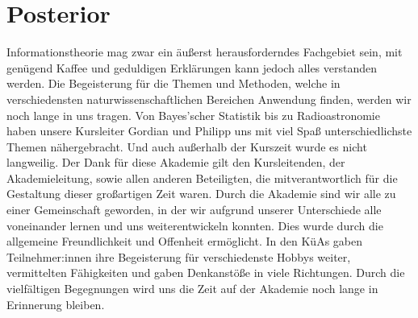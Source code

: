 \section{Posterior}

Informationstheorie mag zwar ein äußerst herausforderndes Fachgebiet sein, mit genügend Kaffee und geduldigen Erklärungen kann jedoch alles verstanden werden. Die Begeisterung für die Themen und Methoden, welche in verschiedensten naturwissenschaftlichen Bereichen Anwendung finden, werden wir noch lange in uns tragen. Von Bayes’scher Statistik bis zu Radioastronomie haben unsere Kursleiter Gordian und Philipp uns mit viel Spaß unterschiedlichste Themen nähergebracht. Und auch außerhalb der Kurszeit wurde es nicht langweilig. Der Dank für diese Akademie gilt den Kursleitenden, der Akademieleitung, sowie allen anderen Beteiligten, die mitverantwortlich für die Gestaltung dieser großartigen Zeit waren. Durch die Akademie sind wir alle zu einer Gemeinschaft geworden, in der wir aufgrund unserer Unterschiede alle voneinander lernen und uns weiterentwickeln konnten. Dies wurde durch die allgemeine Freundlichkeit und Offenheit ermöglicht. In den KüAs gaben Teilnehmer:innen ihre Begeisterung für verschiedenste Hobbys weiter, vermittelten Fähigkeiten und gaben Denkanstöße in viele Richtungen. Durch die vielfältigen Begegnungen wird uns die Zeit auf der Akademie noch lange in Erinnerung bleiben.
